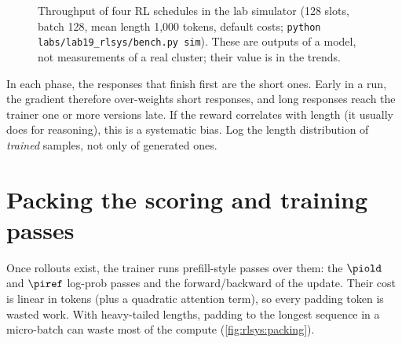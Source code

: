 \begin{figure}[t]
\centering
{}
\caption{Throughput of four RL schedules in the lab simulator (128 slots, batch 128, mean
length 1{,}000 tokens, default costs; \texttt{python labs/lab19\_rlsys/bench.py sim}).
These are outputs of a model, not measurements of a real cluster; their value is in the
trends.}
\label{fig:rlsys:simresults}
\end{figure}

\begin{pitfall}
In each phase, the responses that finish first are the short ones. Early in a run, the
gradient therefore over-weights short responses, and long responses reach the trainer one or
more versions late. If the reward correlates with length (it usually does for reasoning),
this is a systematic bias. Log the length distribution of \emph{trained} samples, not only of
generated ones.
\end{pitfall}

\section{Packing the scoring and training passes}\label{sec:rlsys:packing}

Once rollouts exist, the trainer runs prefill-style passes over them: the $\piold$ and $\piref$
log-prob passes and the forward/backward of the update. Their cost is linear in tokens (plus a
quadratic attention term), so every padding token is wasted work. With heavy-tailed lengths,
padding to the longest sequence in a micro-batch can waste most of the compute
(\cref{fig:rlsys:packing}).

